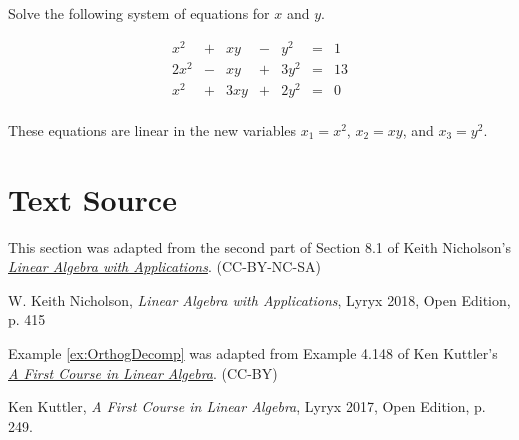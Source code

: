 \documentclass{ximera}
\begin{document}
\begin{problem}\label{prb:quadratic}
Solve the following system of equations for $x$ and $y$.

\begin{equation*}
\begin{array}{rlrlrcr}
	  x^2 & + &   xy & - &   y^2 & = &  1 \\
	 2x^2 & - &   xy & + &  3y^2 & = & 13 \\
	  x^2 & + &  3xy & + &  2y^2 & = &  0 \\
\end{array}
\end{equation*}
\begin{hint}
These equations are linear in the new variables $x_{1} = x^{2}$, $x_{2} = xy$, and $x_{3} = y^{2}$.
\end{hint}
\end{problem}





\section*{Text Source} This section was adapted from the second part of Section 8.1 of Keith Nicholson's \href{https://open.umn.edu/opentextbooks/textbooks/linear-algebra-with-applications}{\it Linear Algebra with Applications}. (CC-BY-NC-SA)

W. Keith Nicholson, {\it Linear Algebra with Applications}, Lyryx 2018, Open Edition, p. 415 

Example \ref{ex:OrthogDecomp}  was adapted from Example 4.148  of Ken Kuttler's \href{https://open.umn.edu/opentextbooks/textbooks/a-first-course-in-linear-algebra-2017}{\it A First Course in Linear Algebra}. (CC-BY)

Ken Kuttler, {\it  A First Course in Linear Algebra}, Lyryx 2017, Open Edition, p. 249. 
\end{document}
